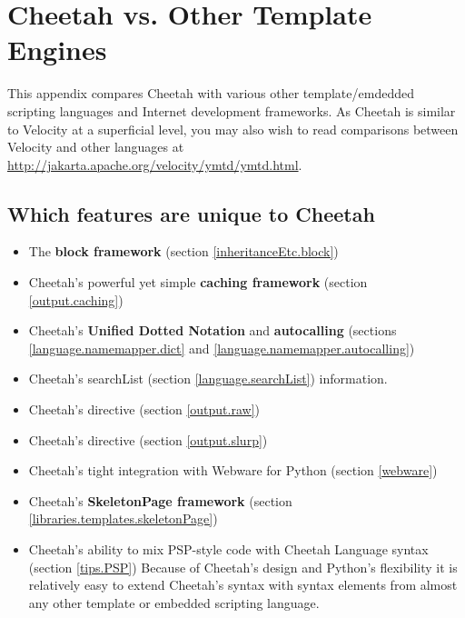 \section{Cheetah vs. Other Template Engines}
\label{comparisons}

This appendix compares Cheetah with various other template/emdedded scripting
languages and Internet development frameworks.  As Cheetah is similar to
Velocity at a superficial level, you may also wish to read comparisons between
Velocity and other languages at
\url{http://jakarta.apache.org/velocity/ymtd/ymtd.html}.

\subsection{Which features are unique to Cheetah}
\label{comparisons.unique}

\begin{itemize}
\item The {\bf block framework} (section \ref{inheritanceEtc.block})
\item Cheetah's powerful yet simple {\bf caching framework} (section
     \ref{output.caching})
\item Cheetah's {\bf Unified Dotted Notation} and {\bf autocalling}
     (sections \ref{language.namemapper.dict} and
     \ref{language.namemapper.autocalling})
\item Cheetah's searchList (section \ref{language.searchList})
     information.
\item Cheetah's  directive (section \ref{output.raw})
\item Cheetah's  directive (section \ref{output.slurp})
\item Cheetah's tight integration with Webware for Python (section
     \ref{webware})
\item Cheetah's {\bf SkeletonPage framework} (section
     \ref{libraries.templates.skeletonPage})
\item Cheetah's ability to mix PSP-style code with Cheetah
     Language syntax (section \ref{tips.PSP}) 
     Because of Cheetah's design and Python's flexibility it is
     relatively easy to extend Cheetah's syntax with syntax elements from almost
     any other template or embedded scripting language.
\end{itemize}


